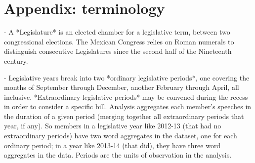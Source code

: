 \documentclass[letter,12pt]{article}
\begin{document}

\singlespacing

\section{Appendix: terminology}


- A *Legislature* is an elected chamber for a legislative term, between two congressional elections. The Mexican Congress relies on Roman numerals to distinguish consecutive Legislatures since the second half of the Nineteenth century.

- Legislative years break into two *ordinary legislative periods*, one covering the months of September through December, another February through April, all inclusive. *Extraordinary legislative periods* may be convened during the recess in order to consider a specific bill. Analysis aggregates each member's speeches in the duration of a given period (merging together all extraordinary periods that year, if any). So members in a legislative year like 2012-13 (that had no extraordinary periods) have two word aggregates in the dataset, one for each ordinary period; in a year like 2013-14 (that did), they have three word aggregates in the data. Periods are the units of observation in the analysis. 
\end{document}
